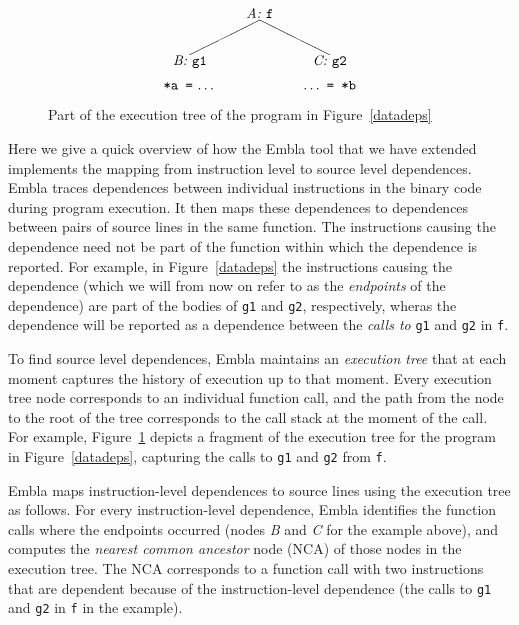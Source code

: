 \begin{figure} \small
\hrulefill
\[
\begin{picture}(160,60)(70,15)
\put(120,65){\makebox(60,10)[c]{\it A:\ \tt f}}
\put(150,65){\line(-2,-1){50}}
\put(150,65){\line( 2,-1){50}}
\put(170,30){\makebox(60,10)[c]{\it C:\ \tt g2}}
\put(70,30){\makebox(60,10)[c]{\it B:\ \tt g1}}
\put(70,15){\makebox(60,10)[cb]{{\tt *a\ =}\ \ldots}}
\put(170,15){\makebox(60,10)[cb]{\ldots\ {\tt =\ *b}}}
\end{picture}
\]
\hrulefill
\caption{Part of the execution tree of the program in Figure~\ref{datadeps}
} 
\label{ffextree}
\end{figure}

Here we give a quick overview of how the Embla tool that we have extended
implements the mapping from instruction level to source level dependences.
Embla traces dependences between individual instructions in the binary
code during program execution. It then maps these dependences to 
dependences between pairs of source lines in the same function. The
instructions causing the dependence need not be part of the function 
within which the dependence is reported. For example, in 
Figure~\ref{datadeps} the instructions causing the dependence (which we
will from now on refer to as the {\em endpoints} of the dependence) 
are part of the bodies of {\tt g1} and {\tt g2}, respectively, wheras the dependence 
will be reported as a dependence between the {\em calls to} {\tt g1} and 
{\tt g2} in {\tt f}.

To find source level dependences, Embla maintains an {\em execution tree} 
that at each moment captures 
the history of execution up to that moment. Every execution tree node 
corresponds to an
individual function call, and the path from the node to the root of the
tree corresponds to the call stack at the moment of the call. For
example, Figure~\ref{ffextree} depicts a fragment of the execution tree
for the program in Figure~\ref{datadeps}, capturing the calls to {\tt g1} 
and {\tt g2} from {\tt f}.

Embla maps instruction-level dependences to source lines
 using the execution tree as follows. For
every instruction-level dependence, Embla identifies the function calls
where the endpoints occurred (nodes {\it B} and {\it C} for the example
above), and computes the {\em nearest common ancestor} node (NCA) of
those nodes in the execution tree. The NCA corresponds to a function
call with two instructions that are dependent because of
the instruction-level dependence (the calls to {\tt g1} and {\tt g2} in 
{\tt f} in the example).

